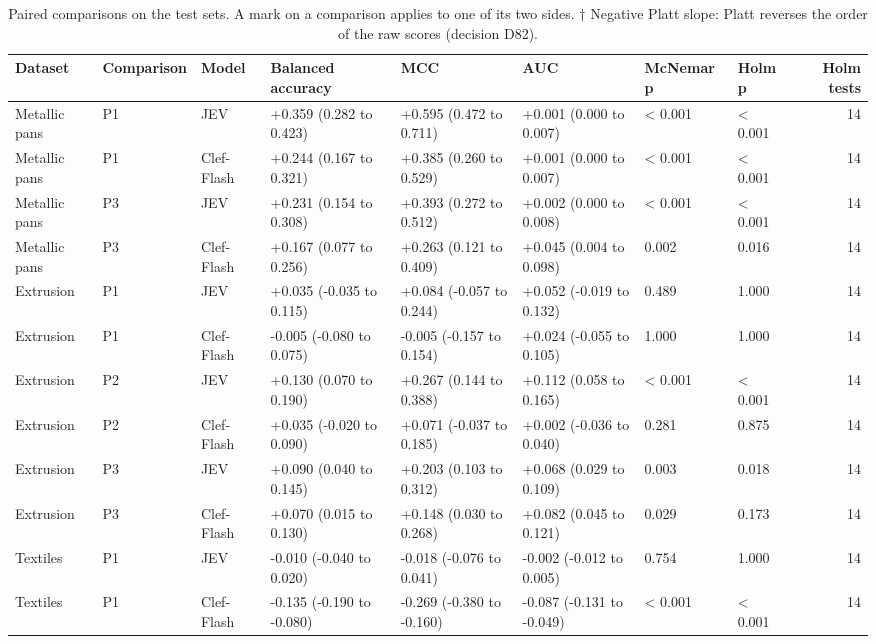 \begin{table}

\caption{\label{tab:tbl-paired}Paired comparisons on the test sets. A mark on a comparison applies to one of its two sides. † Negative Platt slope: Platt reverses the order of the raw scores (decision D82).}
\centering
\begin{tabular}[t]{llllllllr}
\toprule
Dataset & Comparison & Model & Balanced accuracy & MCC & AUC & McNemar p & Holm p & Holm tests\\
\midrule
Metallic pans & P1 & JEV & +0.359 (0.282 to 0.423) & +0.595 (0.472 to 0.711) & +0.001 (0.000 to 0.007) & < 0.001 & < 0.001 & 14\\
Metallic pans & P1 & Clef-Flash & +0.244 (0.167 to 0.321) & +0.385 (0.260 to 0.529) & +0.001 (0.000 to 0.007) & < 0.001 & < 0.001 & 14\\
Metallic pans & P3 & JEV & +0.231 (0.154 to 0.308) & +0.393 (0.272 to 0.512) & +0.002 (0.000 to 0.008) & < 0.001 & < 0.001 & 14\\
Metallic pans & P3 & Clef-Flash & +0.167 (0.077 to 0.256) & +0.263 (0.121 to 0.409) & +0.045 (0.004 to 0.098) & 0.002 & 0.016 & 14\\
Extrusion & P1 & JEV & +0.035 (-0.035 to 0.115) & +0.084 (-0.057 to 0.244) & +0.052 (-0.019 to 0.132) & 0.489 & 1.000 & 14\\
\addlinespace
Extrusion & P1 & Clef-Flash & -0.005 (-0.080 to 0.075) & -0.005 (-0.157 to 0.154) & +0.024 (-0.055 to 0.105) & 1.000 & 1.000 & 14\\
Extrusion & P2 & JEV & +0.130 (0.070 to 0.190) & +0.267 (0.144 to 0.388) & +0.112 (0.058 to 0.165) & < 0.001 & < 0.001 & 14\\
Extrusion & P2 & Clef-Flash & +0.035 (-0.020 to 0.090) & +0.071 (-0.037 to 0.185) & +0.002 (-0.036 to 0.040) & 0.281 & 0.875 & 14\\
Extrusion & P3 & JEV & +0.090 (0.040 to 0.145) & +0.203 (0.103 to 0.312) & +0.068 (0.029 to 0.109) & 0.003 & 0.018 & 14\\
Extrusion & P3 & Clef-Flash & +0.070 (0.015 to 0.130) & +0.148 (0.030 to 0.268) & +0.082 (0.045 to 0.121) & 0.029 & 0.173 & 14\\
\addlinespace
Textiles & P1 & JEV & -0.010 (-0.040 to 0.020) & -0.018 (-0.076 to 0.041) & -0.002 (-0.012 to 0.005) & 0.754 & 1.000 & 14\\
Textiles & P1 & Clef-Flash & -0.135 (-0.190 to -0.080) & -0.269 (-0.380 to -0.160) & -0.087 (-0.131 to -0.049) & < 0.001 & < 0.001 & 14\\

\end{tabular}
\end{table}
